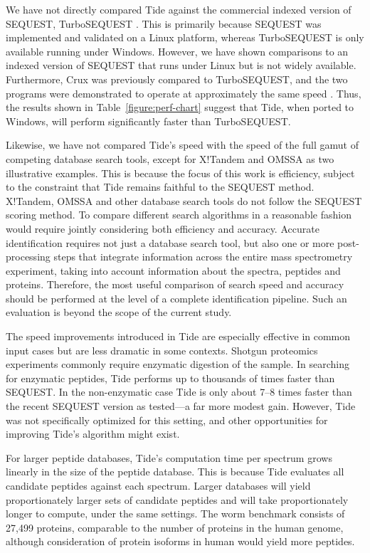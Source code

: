 We have not directly compared Tide against the commercial indexed
version of SEQUEST, TurboSEQUEST \cite{lundgren:protein}.  This is
primarily because SEQUEST was implemented and validated on a Linux
platform, whereas TurboSEQUEST is only available running under
Windows.  However, we have shown comparisons to an indexed version of
SEQUEST that runs under Linux but is not widely available.
Furthermore, Crux was previously compared to TurboSEQUEST, and the two
programs were demonstrated to operate at approximately the same speed
\cite{park:rapid}. Thus, the results shown in
Table~\ref{figure:perf-chart} suggest that Tide, when ported to Windows,
will perform significantly faster than TurboSEQUEST.

Likewise, we have not compared Tide's speed with the speed of the full
gamut of competing database search tools, except for X!Tandem and
OMSSA as two illustrative examples.  This is because the focus of this
work is efficiency, subject to the constraint that Tide remains
faithful to the SEQUEST method. X!Tandem, OMSSA and other database
search tools do not follow the SEQUEST scoring method. To compare
different search algorithms in a reasonable fashion would require
jointly considering both efficiency and accuracy.  Accurate
identification requires not just a database search tool, but also one
or more post-processing steps that integrate information across the
entire mass spectrometry experiment, taking into account information
about the spectra, peptides and proteins.  Therefore, the most useful
comparison of search speed and accuracy should be performed at the
level of a complete identification pipeline.  Such an evaluation is
beyond the scope of the current study.

The speed improvements introduced in Tide are especially effective in
common input cases but are less dramatic in some contexts.  Shotgun
proteomics experiments commonly require enzymatic digestion of the
sample. In searching for enzymatic peptides, Tide performs up to
thousands of times faster than SEQUEST. In the non-enzymatic case Tide
is only about 7--8 times faster than the recent SEQUEST version as
tested---a far more modest gain. However, Tide was not specifically
optimized for this setting, and other opportunities for improving
Tide's algorithm might exist.

For larger peptide databases, Tide's computation time per spectrum
grows linearly in the size of the peptide database. This is because
Tide evaluates all candidate peptides against each spectrum. Larger
databases will yield proportionately larger sets of candidate peptides
and will take proportionately longer to compute, under the same
settings. The worm benchmark consists of 27,499 proteins, comparable
to the number of proteins in the human genome, although consideration
of protein isoforms in human would yield more peptides.

